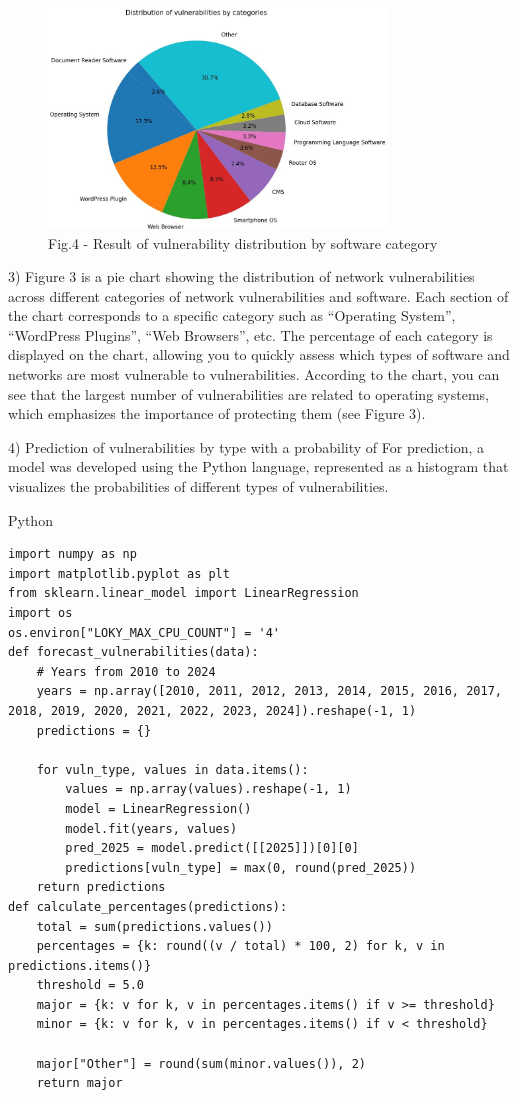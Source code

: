 \begin{figure}[H]
	\centering
	\includegraphics[width=0.8\textwidth]{media/ict2/image166}
	\caption*{Fig.4 - Result of vulnerability distribution by software category}
\end{figure}

\begin{multicols}{2}
3) Figure 3 is a pie chart showing the distribution of network
vulnerabilities across different categories of network vulnerabilities
and software. Each section of the chart corresponds to a specific
category such as ``Operating System'', ``WordPress Plugins'', ``Web
Browsers'', etc. The percentage of each category is displayed on the
chart, allowing you to quickly assess which types of software and
networks are most vulnerable to vulnerabilities. According to the
chart, you can see that the largest number of vulnerabilities are
related to operating systems, which emphasizes the importance of
protecting them (see Figure 3).

4) Prediction of vulnerabilities by type with a probability of
For prediction, a model was developed using the Python language,
represented as a histogram that visualizes the probabilities of
different types of vulnerabilities.
\end{multicols}

Python

\begin{lstlisting}
import numpy as np
import matplotlib.pyplot as plt
from sklearn.linear_model import LinearRegression
import os
os.environ["LOKY_MAX_CPU_COUNT"] = '4'
def forecast_vulnerabilities(data):
    # Years from 2010 to 2024
    years = np.array([2010, 2011, 2012, 2013, 2014, 2015, 2016, 2017, 2018, 2019, 2020, 2021, 2022, 2023, 2024]).reshape(-1, 1)
    predictions = {}

    for vuln_type, values in data.items():
        values = np.array(values).reshape(-1, 1)
        model = LinearRegression()
        model.fit(years, values)
        pred_2025 = model.predict([[2025]])[0][0]
        predictions[vuln_type] = max(0, round(pred_2025))
    return predictions
def calculate_percentages(predictions):
    total = sum(predictions.values())
    percentages = {k: round((v / total) * 100, 2) for k, v in predictions.items()}
    threshold = 5.0
    major = {k: v for k, v in percentages.items() if v >= threshold}
    minor = {k: v for k, v in percentages.items() if v < threshold}

    major["Other"] = round(sum(minor.values()), 2)
    return major
\end{lstlisting}

